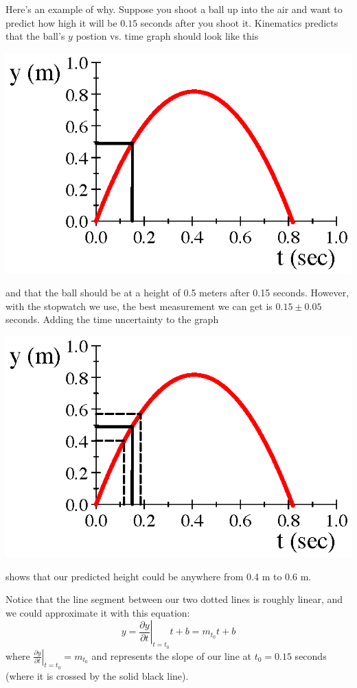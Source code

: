 \documentclass[twoside,11pt,ShortChapTitles]{BYUTextbook}
\begin{document}
Here's an example of why.  Suppose you shoot a ball up into the air and want to predict how high it will be $0.15$ seconds after you shoot it.  Kinematics predicts that the ball's $y$ postion vs. time graph should look like this
\begin{center}
\includegraphics{Lab3_figs/Parab_onepoint.eps}
\end{center}
and that the ball should be at a height of 0.5 meters after 0.15 seconds.  However, with the stopwatch we use, the best measurement we can get is $0.15 \pm 0.05$ seconds.  Adding the time uncertainty to the graph
\begin{center}
\includegraphics{Lab3_figs/Parab_threepoints.eps}
\end{center}
shows that our predicted height could be anywhere from 0.4 m to 0.6 m.

Notice that the line segment between our two dotted lines is roughly linear, and we could approximate it with this equation:
\[y = \left.\frac{\partial y}{\partial t}\right|_{t=t_0}t+b = m_{t_0}t+b\]
where $\left.\frac{\partial y}{\partial t}\right|_{t=t_0} = m_{t_0}$ and represents the slope of our line at $t_0=0.15$ seconds (where it is crossed by the solid black line).
\end{document}
